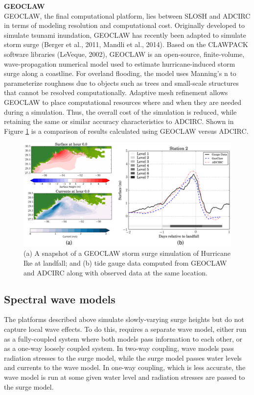 \noindent\textbf{GEOCLAW} \\GEOCLAW, the final computational platform, lies between SLOSH and ADCIRC in terms of modeling resolution and computational cost. Originally developed to simulate tsunami inundation, GEOCLAW has recently been adapted to simulate storm surge (Berger et al., 2011, Mandli et al., 2014). Based on the CLAWPACK software libraries (LeVeque, 2002), GEOCLAW is an open-source, finite-volume, wave-propagation numerical model used to estimate hurricane-induced storm surge along a coastline. For overland flooding, the model uses Manning's n to parameterize roughness due to objects such as trees and small-scale structures that cannot be resolved computationally. Adaptive mesh refinement allows GEOCLAW to place computational resources where and when they are needed during a simulation. Thus, the overall cost of the simulation is reduced, while retaining the same or similar accuracy characteristics to ADCIRC. Shown in Figure \ref{fig:GEOCLAW_ADCIRC_comparison} is a comparison of results calculated using GEOCLAW versus ADCIRC. 

\begin{figure}[htb]
    \centering
    \includegraphics[width=1.0\textwidth, angle = 0]{Figures/GEOCLAW_ADCIRC_comparison.png}
    \caption{(a) A snapshot of a GEOCLAW storm surge simulation of Hurricane Ike at landfall; and (b) tide gauge data computed from GEOCLAW and ADCIRC along with observed data at the same location. \citep{mandli2016a}}
    \label{fig:GEOCLAW_ADCIRC_comparison}
\end{figure}

\subsection{Spectral wave models}

The platforms described above simulate slowly-varying surge heights but do not capture local wave effects. To do this, requires a separate wave model, either run as a fully-coupled system where both models pass information to each other, or as a one-way loosely coupled system. In two-way coupling, wave models pass radiation stresses to the surge model, while the surge model passes water levels and currents to the wave model. In one-way coupling, which is less accurate, the wave model is run at some given water level and radiation stresses are passed to the surge model.

